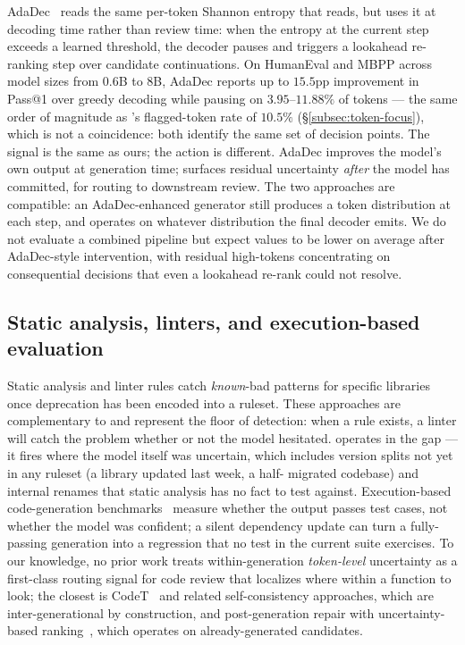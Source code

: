 AdaDec~\cite{adadec2025} reads the same per-token Shannon entropy
that \eps reads, but uses it at decoding time rather than review
time: when the entropy at the current step exceeds a learned
threshold, the decoder pauses and triggers a lookahead re-ranking
step over candidate continuations. On HumanEval and MBPP across
model sizes from $0.6$B to $8$B, AdaDec reports up to $15.5$pp
improvement in Pass@1 over greedy decoding while pausing on
$3.95$--$11.88\%$ of tokens --- the same order of magnitude as
\eps's flagged-token rate of $10.5\%$ (\S\ref{subsec:token-focus}),
which is not a coincidence: both identify the same set of decision
points. The signal is the same as ours; the action is different.
AdaDec improves the model's own output at generation time; \eps
surfaces residual uncertainty \emph{after} the model has committed,
for routing to downstream review. The two approaches are compatible:
an AdaDec-enhanced generator still produces a token distribution at
each step, and \eps operates on whatever distribution the final
decoder emits. We do not evaluate a combined pipeline but expect
\eps values to be lower on average after AdaDec-style intervention,
with residual high-\eps tokens concentrating on consequential
decisions that even a lookahead re-rank could not resolve.

\subsection{Static analysis, linters, and execution-based evaluation}
\label{subsec:related-static}

Static analysis and linter rules catch \emph{known}-bad patterns for
specific libraries once deprecation has been encoded into a ruleset.
These approaches are complementary to \eps and represent the floor
of detection: when a rule exists, a linter will catch the problem
whether or not the model hesitated. \eps operates in the gap --- it
fires where the model itself was uncertain, which includes version
splits not yet in any ruleset (a library updated last week, a half-%
migrated codebase) and internal renames that static analysis has no
fact to test against. Execution-based code-generation
benchmarks~\cite{chen2021evaluating,austin2021program,%
jimenez2024swebench} measure whether the output passes test cases,
not whether the model was confident; a silent dependency update can
turn a fully-passing generation into a regression that no test in
the current suite exercises. To our knowledge, no prior work treats
within-generation \emph{token-level} uncertainty as a first-class
routing signal for code review that localizes where within a
function to look; the closest is CodeT~\cite{chen2022codet} and
related self-consistency approaches, which are inter-generational by
construction, and post-generation repair with uncertainty-based
ranking~\cite{ye2022selfapr}, which operates on already-generated
candidates.
